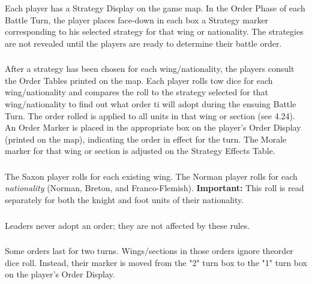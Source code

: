 \subsubsection[Strategy Display]{}

Each player has a Strategy Display on the game map. In the Order Phase of each Battle Turn, the player places face-down in each box a Strategy marker corresponding to his selected strategy for that wing or nationality. The strategies are not revealed until the players are ready to determine their battle order.

\subsubsection[Order Tables]{}

After a strategy has been chosen for each wing/nationality, the players consult the Order Tables printed on the map. Each player rolls tow dice for each wing/nationality and compares the roll to the strategy selected for that wing/nationality to find out what order ti will adopt during the ensuing Battle Turn. The order rolled is applied to all units in that wing or section (see 4.24). An Order Marker is placed in the appropriate box on the player's Order Display (printed on the map), indicating the order in effect for the turn. The Morale marker for that wing or section is adjusted on the Strategy Effects Table.

\subsubsection[Orders]{}

The Saxon player rolls for each existing wing. The Norman player rolls for each \textit{nationality} (Norman, Breton, and Franco-Flemish). \textbf{Important:} This roll is read separately for both the knight and foot units of their nationality.

\subsubsection[Leaders and Orders]{}

Leaders never adopt an order; they are not affected by these rules.

\subsubsection[Order Length]{}

Some orders last for two turns. Wings/sections in those orders ignore theorder dice roll. Instead, their marker is moved from the "2" turn box to the "1" turn box on the player's Order Display.

